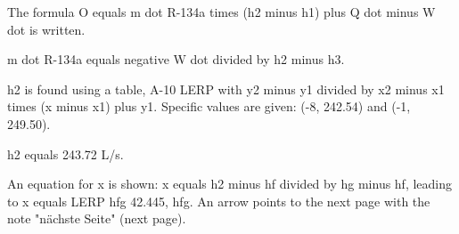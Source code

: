 The formula O equals m dot R-134a times (h2 minus h1) plus Q dot minus W dot is written. 

m dot R-134a equals negative W dot divided by h2 minus h3.

h2 is found using a table, A-10 LERP with y2 minus y1 divided by x2 minus x1 times (x minus x1) plus y1. Specific values are given: (-8, 242.54) and (-1, 249.50).

h2 equals 243.72 L/s.

An equation for x is shown: x equals h2 minus hf divided by hg minus hf, leading to x equals LERP hfg 42.445, hfg. An arrow points to the next page with the note "nächste Seite" (next page).